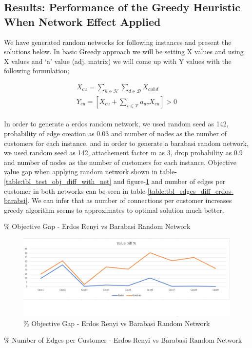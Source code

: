 \documentclass[11pt]{article}
\begin{document}
\subsection{Results: Performance of the Greedy Heuristic When Network Effect Applied} \label{s:test_evaluation_net_effect}
We have generated random networks for following instances and present the solutions below. In basic Greedy approach we will be setting X values and using X values and ‘a’ value (adj. matrix) we will come up with Y values with the following formulation;

\begin{align}
X_{{c}{u}}=\sum\limits_{h\in \mathcal{H}}\sum\limits_{d\in \mathcal{D}}
X_{{c}{u}{h}{d}} \label{net_perf_conv_x} \\
Y_{{c}{u}}=[X_{{c}{u}} + \sum\limits_{v\in \mathcal{V}}
a_{{u}{v}}X_{{c}{u}}] > 0 \label{net_perf_conv_y}
\end{align}\\

In order to generate a erdos random network, we used random seed as 142, probability of edge creation as 0.03 and number of nodes as the number of customers for each instance, and in order to generate a barabasi random network, we used random seed as 142, attachement factor m as 3, drop probability as 0.9 and number of nodes as the number of customers for each instance.
Objective value gap when applying random network shown in table-\ref{table:tbl_test_obj_diff_with_net} and figure-\ref{fig:fig_value_diff_with_net} and number of edges per customer in both networks can be seen in table-\ref{table:tbl_edges_diff_erdos-barabsi}. We can infer that as number of connections per customer increases greedy algorithm seems to approximates to optimal solution much better. 

\begin{table}[htb]
        \centering
        \caption[Short Caption for LoT]{\% Objective Gap - Erdos Renyi vs Barabasi Random Network }\label{table:tbl_test_obj_diff_with_net}
\end{table}
\begin{figure}[htp]
    \centering
    \includegraphics[width=12cm]{value_diff_with_net}
    \caption{\% Objective Gap  - Erdos Renyi vs Barabasi Random Network}
    \label{fig:fig_value_diff_with_net}
\end{figure}
\begin{table}[htb]
        \centering
        \caption[Short Caption for LoT]{\% Number of Edges per Customer - Erdos Renyi vs Barabasi Random Network }\label{table:tbl_edges_diff_erdos-barabsi}
\end{table}
\end{document}
